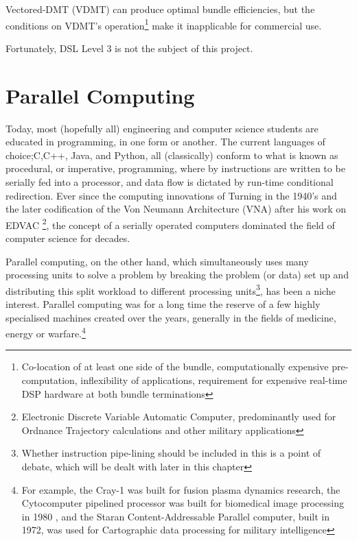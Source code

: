 Vectored-DMT (VDMT) can produce optimal bundle efficiencies, but the conditions on VDMT's operation\footnote{Co-location of at least one side of the bundle, computationally expensive pre-computation, inflexibility of applications, requirement for expensive real-time DSP hardware at both bundle terminations} make it inapplicable for commercial use.

Fortunately, DSL Level 3 is not the subject of this project.

\section{Parallel Computing}\label{sec:ParallelComputing}
Today, most (hopefully all) engineering and computer science students are educated in programming, in one form or another. The current languages of choice;C,C++, Java, and Python, all (classically) conform to what is known as procedural, or imperative, programming, where by instructions are written to be serially fed into a processor, and data flow is dictated by run-time conditional redirection. Ever since the computing innovations of Turning in the 1940's\cite{Tur36} and the later codification of the Von Neumann Architecture (VNA) after his work on EDVAC \footnote{Electronic Discrete Variable Automatic Computer, predominantly used for Ordnance Trajectory calculations and other military applications}\cite{VN45}, the concept of a serially operated computers dominated the field of computer science for decades.

Parallel computing, on the other hand, which simultaneously uses many processing units to solve a problem by breaking the problem (or data) set up and distributing this split workload to different processing units\footnote{Whether instruction pipe-lining should be included in this is a point of debate, which will be dealt with later in this chapter}, has been a niche interest. Parallel computing was for a long time the reserve of a few highly specialised machines created over the years, generally in the fields of medicine, energy or warfare.\footnote{For example, the Cray-1 was built for fusion plasma dynamics research, the Cytocomputer pipelined processor was built for biomedical image processing in 1980 \cite{RML80}, and the Staran Content-Addressable Parallel computer, built in 1972, was used for Cartographic data processing for military intelligence\cite{KH84}}

